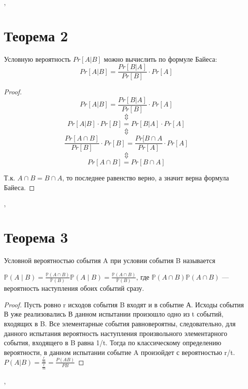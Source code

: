 \documentclass[a4paper,12pt]{article}
\begin{document}
    \sep
    \section{Теорема 2}
        \begin{theorem}
            Условную вероятность $Pr[A|B]$ можно вычислить по формуле Байеса: 
                $$ Pr[A|B] = \frac{Pr[B|A]}{Pr[B]} \cdot Pr[A]$$
        \end{theorem}

        \begin{proof}
            $$ Pr[A|B] = \frac{Pr[B|A]}{Pr[B]} \cdot Pr[A] $$
                $$\Updownarrow$$
            $$ Pr[A|B] \cdot Pr[B] = Pr[B|A] \cdot Pr[A] $$
                $$\Updownarrow$$
            $$ \frac{Pr[A\cap B]}{Pr[B]} \cdot Pr[B] = \frac{Pr[B\cap A}{Pr[A]} \cdot Pr[A] $$
                $$\Updownarrow$$
            $$Pr[A\cap B] = Pr[B\cap A]$$

            Т.к. $A\cap B = B\cap A$, то последнее равенство верно, а значит верна формула Байеса. 
        \end{proof}

    \sep
    \section {Теорема 3}
    \begin{theorem}
   Условной вероятностью события A при условии события B называется

${\displaystyle \mathbb {P} (A\mid B)={\frac {\mathbb {P} (A\cap B)}{\mathbb {P} (B)}}} \mathbb{P}(A \mid B) = \frac{\mathbb{P}(A\cap B)}{\mathbb{P}(B)}$, где ${\displaystyle \mathbb {P} (A\cap B)} {\displaystyle \mathbb {P} (A\cap B)}$ — вероятность наступления обоих событий сразу.
    \end{theorem}
    \begin{proof}
    Пусть ровно r исходов события B входят и в событие А. Исходы события В уже реализовались
    В данном испытании произошло одно из t событий, входящих в B. Все элементарные события равновероятны, следовательно, для данного испытания вероятность наступления произвольного элементарного события, входящего в B равна 1/t. Тогда по классическому определению вероятности, в данном испытании событие A произойдет с вероятностью r/t.
    $P(A|B) = \frac{\frac{r}{m}}{\frac{t}{m}} = \frac{P(AB)}{P{B}}$

    
    \end{proof}
    \sep
\end{document}
